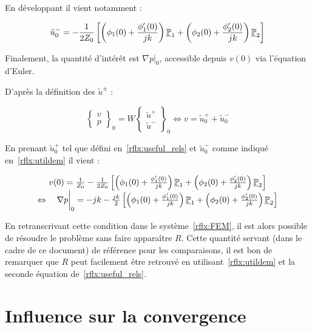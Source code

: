 En développant il vient notamment :

\begin{equation}
	\tilde{u}^-_0 = -\frac{1}{2Z_0}\left[\left(\phi_1(0) + \frac{\phi'_1(0)}{jk}\right)\underline{\mathbb{P}}_1 + \left(\phi_2(0) + \frac{\phi'_2(0)}{jk}\right)\underline{\mathbb{P}}_2 \right]\label{rflx:utildem}
\end{equation}

Finalement, la quantité d'intérêt est $\nabla p\big|_0$, accessible depuis $v(0)$ via l'équation d'Euler.

\pagebreak

D'après la définition des $\tilde{u}^\pm$ :


\begin{equation*}
\begin{Bmatrix}
	v\\p
\end{Bmatrix}_0
= W\begin{Bmatrix}
	\tilde{u}^+\\\tilde{u}^-
\end{Bmatrix}_0 \Leftrightarrow
v = \tilde{u}^+_0 + \tilde{u}^-_0
\end{equation*}

En prenant $\tilde{u}^+_0$ tel que défini en~\eqref{rflx:useful_rels} et $\tilde{u}^-_0$ comme indiqué
en~\eqref{rflx:utildem} il vient :

\begin{equation*}
	\begin{array}{c}
	v(0) = \frac{1}{Z_0} -\frac{1}{2Z_0}\left[\left(\phi_1(0) + \frac{\phi'_1(0)}{jk}\right)\underline{\mathbb{P}}_1 + \left(\phi_2(0) + \frac{\phi'_2(0)}{jk}\right)\underline{\mathbb{P}}_2 \right]\\
	\Leftrightarrow\quad \nabla p\bigg|_0 = - jk -\frac{jk}{2}\left[\left(\phi_1(0) + \frac{\phi'_1(0)}{jk}\right)\underline{\mathbb{P}}_1 + \left(\phi_2(0) + \frac{\phi'_2(0)}{jk}\right)\underline{\mathbb{P}}_2 \right]
	\end{array}
\end{equation*}


En retranscrivant cette condition dans le système~\eqref{rflx:FEM}, il est alors possible de résoudre le problème sans
faire apparaître $R$. Cette quantité servant (dans le cadre de ce document) de référence pour les comparaisons, il est
bon de remarquer que $R$ peut facilement être retrouvé en utilisant~\eqref{rflx:utildem} et la seconde équation
de~\eqref{rflx:useful_rels}.

\section{Influence sur la convergence}

